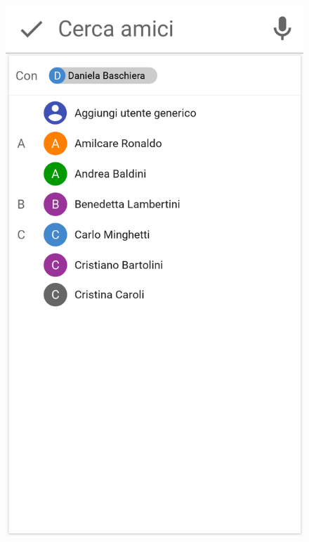 \begin{figure}[H]
\begin{minipage}{.49\textwidth}
		\includegraphics[width=\textwidth]{img/wireframe/aggiungi_utente_daniela.png}
	\end{minipage}
\end{figure}	
